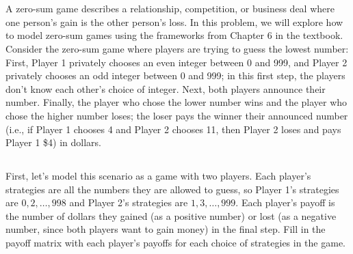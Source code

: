\documentclass[newpages]{assignment}
\begin{document}
\section{}

\begin{problem}
    A zero-sum game describes a relationship, competition, or business deal where one person's gain is the other person's loss. In this problem, we will explore how to model zero-sum games using the frameworks from Chapter 6 in the textbook. Consider the zero-sum game where players are trying to guess the lowest number: First, Player 1 privately chooses an even integer between 0 and 999, and Player 2 privately chooses an odd integer between 0 and 999; in this first step, the players don't know each other's choice of integer. Next, both players announce their number. Finally, the player who chose the lower number wins and the player who chose the higher number loses; the loser pays the winner their announced number (i.e., if Player 1 chooses 4 and Player 2 chooses 11, then Player 2 loses and pays Player 1 \$4) in dollars.
\end{problem}

\subsection{}

\begin{problem}
    First, let's model this scenario as a game with two players. Each player's
    strategies are all the numbers they are allowed to guess, so Player 1's
    strategies are \(0, 2, \ldots, 998\) and Player 2's strategies are
    \(1, 3, \ldots, 999\). Each player's payoff is the number of dollars they
    gained (as a positive number) or lost (as a negative number, since both
    players want to gain money) in the final step. Fill in the payoff
    matrix with each player's payoffs for each choice of strategies in the game.
\end{problem}
\end{document}
